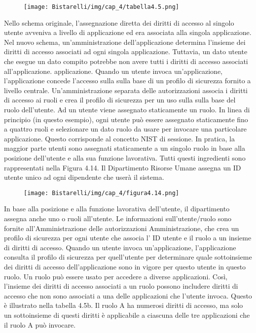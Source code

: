 \singlespacing

\begin{figure}[H]
	\centering
    \texttt{[image: Bistarelli/img/cap\_4/tabella4.5.png]}
\end{figure}

Nello schema originale, l'assegnazione diretta dei diritti di accesso al singolo utente avveniva a livello di applicazione ed era associata alla singola applicazione. Nel nuovo schema, un'amministrazione dell'applicazione determina l'insieme dei diritti di accesso associati ad ogni singola applicazione. Tuttavia, un dato utente che esegue un dato compito potrebbe non avere tutti i diritti di accesso associati all'applicazione. applicazione. Quando un utente invoca un'applicazione, l'applicazione concede l'accesso sulla sulla base di un profilo di sicurezza fornito a livello centrale. Un'amministrazione separata delle autorizzazioni associa i diritti di accesso ai ruoli e crea il profilo di sicurezza per un uso sulla sulla base del ruolo dell'utente. Ad un utente viene assegnato staticamente un ruolo. In linea di principio (in questo esempio), ogni utente può essere assegnato staticamente fino a quattro ruoli e selezionare un dato ruolo da usare per invocare una particolare applicazione. Questo corrisponde al concetto NIST di sessione. In pratica, la maggior parte utenti sono assegnati staticamente a un singolo ruolo in base alla posizione dell'utente e alla sua funzione lavorativa. Tutti questi ingredienti sono rappresentati nella Figura 4.14. Il Dipartimento Risorse Umane assegna un ID utente unico ad ogni dipendente che userà il sistema.

\singlespacing

\begin{figure}[H]
	\centering
    \texttt{[image: Bistarelli/img/cap\_4/figura4.14.png]}
\end{figure}

In base alla posizione e alla funzione lavorativa dell'utente, il dipartimento assegna anche uno o ruoli all'utente. Le informazioni sull'utente/ruolo sono fornite all'Amministrazione delle autorizzazioni Amministrazione, che crea un profilo di sicurezza per ogni utente che associa l' ID utente e il ruolo a un insieme di diritti di accesso. Quando un utente invoca un'applicazione, l'applicazione consulta il profilo di sicurezza per quell'utente per determinare quale sottoinsieme dei diritti di accesso dell'applicazione sono in vigore per questo utente in questo ruolo. Un ruolo può essere usato per accedere a diverse applicazioni. Così, l'insieme dei diritti di accesso associati a un ruolo possono includere diritti di accesso che non sono associati a una delle applicazioni che l'utente invoca. Questo è illustrato nella tabella 4.5b. Il ruolo A ha numerosi diritti di accesso, ma solo un sottoinsieme di questi diritti è applicabile a ciascuna delle tre applicazioni che il ruolo A può invocare.

